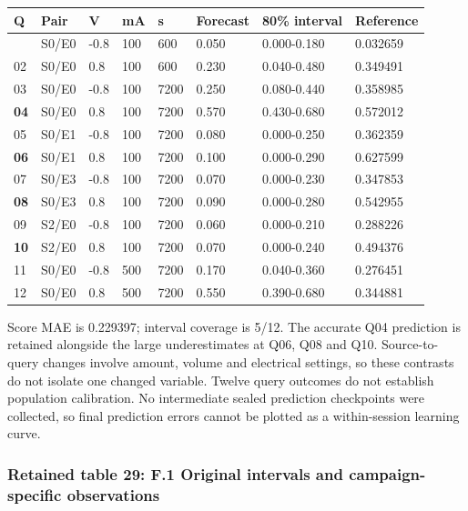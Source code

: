 \documentclass[10pt,a4paper]{article}
\begin{document}
{\def\LTcaptype{table} %
\small\begin{longtable}[]{@{}llllllll@{}}
\toprule\noalign{}
Q & Pair & V & mA & s & Forecast & 80\% interval & Reference \\
\midrule\noalign{}
\endhead
\bottomrule\noalign{}
\endlastfoot
01 & S0/E0 & -0.8 & 100 & 600 & 0.050 & 0.000-0.180 & 0.032659 \\
02 & S0/E0 & 0.8 & 100 & 600 & 0.230 & 0.040-0.480 & 0.349491 \\
03 & S0/E0 & -0.8 & 100 & 7200 & 0.250 & 0.080-0.440 & 0.358985 \\
\textbf{04} & S0/E0 & 0.8 & 100 & 7200 & 0.570 & 0.430-0.680 & 0.572012 \\
05 & S0/E1 & -0.8 & 100 & 7200 & 0.080 & 0.000-0.250 & 0.362359 \\
\textbf{06} & S0/E1 & 0.8 & 100 & 7200 & 0.100 & 0.000-0.290 & 0.627599 \\
07 & S0/E3 & -0.8 & 100 & 7200 & 0.070 & 0.000-0.230 & 0.347853 \\
\textbf{08} & S0/E3 & 0.8 & 100 & 7200 & 0.090 & 0.000-0.280 & 0.542955 \\
09 & S2/E0 & -0.8 & 100 & 7200 & 0.060 & 0.000-0.210 & 0.288226 \\
\textbf{10} & S2/E0 & 0.8 & 100 & 7200 & 0.070 & 0.000-0.240 & 0.494376 \\
11 & S0/E0 & -0.8 & 500 & 7200 & 0.170 & 0.040-0.360 & 0.276451 \\
12 & S0/E0 & 0.8 & 500 & 7200 & 0.550 & 0.390-0.680 & 0.344881 \\
\end{longtable}\normalsize
}

Score MAE is 0.229397; interval coverage is 5/12. The accurate Q04 prediction is retained alongside the large underestimates at Q06, Q08 and Q10. Source-to-query changes involve amount, volume and electrical settings, so these contrasts do not isolate one changed variable. Twelve query outcomes do not establish population calibration. No intermediate sealed prediction checkpoints were collected, so final prediction errors cannot be plotted as a within-session learning curve.

\subsubsection{Retained table 29: F.1 Original intervals and campaign-specific observations}\label{retained-table-29-f.1-original-intervals-and-campaign-specific-observations}
\end{document}
